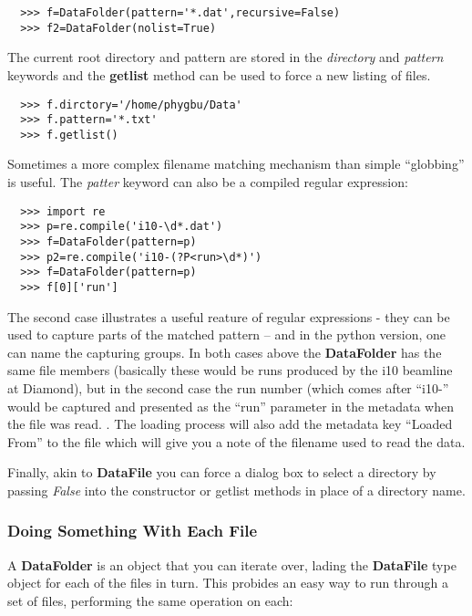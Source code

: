 \documentclass[a4paper,11pt]{scrartcl}
\begin{document}
\begin{verbatim}
  >>> f=DataFolder(pattern='*.dat',recursive=False)
  >>> f2=DataFolder(nolist=True)
\end{verbatim}

The current root directory and pattern are stored in the \textit{directory} and \textit{pattern} keywords and the \textbf{getlist} method can be used to force a new listing of files.

\begin{verbatim}
  >>> f.dirctory='/home/phygbu/Data'
  >>> f.pattern='*.txt'
  >>> f.getlist()
\end{verbatim}

Sometimes a more complex filename matching mechanism than simple ``globbing'' is useful. The \textit{patter} keyword can also be a compiled regular expression:

\begin{verbatim}
  >>> import re
  >>> p=re.compile('i10-\d*.dat')
  >>> f=DataFolder(pattern=p)
  >>> p2=re.compile('i10-(?P<run>\d*)')
  >>> f=DataFolder(pattern=p)
  >>> f[0]['run']
\end{verbatim}

The second case illustrates a useful reature of regular expressions - they can be used to capture parts of the matched pattern -- and in the python version, one can name the capturing groups. In both cases above the \textbf{DataFolder} has the same file members (basically these would be runs produced by the i10 beamline at Diamond), but in the second case the run number (which comes after ``i10-'' would be captured and presented as the ``run'' parameter in the metadata when the file was read. . The loading process will also add the metadata key ``Loaded From'' to the file which will give you a note of the filename used to read the data.

Finally, akin to \textbf{DataFile} you can force a dialog box to select a directory by passing \textit{False} into the constructor or getlist methods in place of a directory name.

\subsubsection{Doing Something With Each File}

A \textbf{DataFolder} is an object that you can iterate over, lading the \textbf{DataFile} type object for each of the files in turn. This probides an easy way to run through a set of files, performing the same operation on each:
\end{document}
